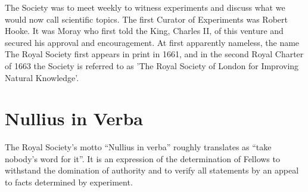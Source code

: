 \documentclass{article}
\begin{document}
The Society was to meet weekly to witness experiments and discuss what we would
now call scientific topics. The first Curator of Experiments was Robert Hooke.
It was Moray who first told the King, Charles II, of this venture and secured
his approval and encouragement. At first apparently nameless, the name The
Royal Society first appears in print in 1661, and in the second Royal Charter
of 1663 the Society is referred to as 'The Royal Society of London for
Improving Natural Knowledge'.

\section{Nullius in Verba}

The Royal Society's motto ``Nullius in verba'' roughly translates as ``take
nobody's word for it''. It is an expression of the determination of Fellows to
withstand the domination of authority and to verify all statements by an appeal
to facts determined by experiment.
\end{document}
